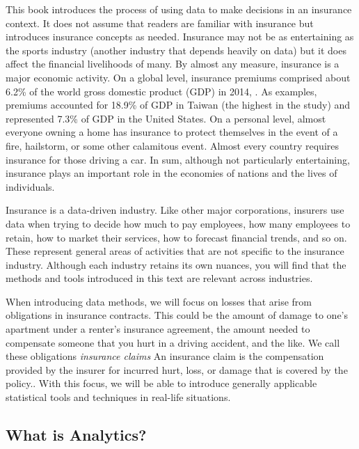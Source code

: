 \documentclass[]{book}
\theoremstyle{definition}
\theoremstyle{definition}
\theoremstyle{definition}
\theoremstyle{remark}
\begin{document}
This book introduces the process of using data to make decisions in an
insurance context. It does not assume that readers are familiar with
insurance but introduces insurance concepts as needed. Insurance may not
be as entertaining as the sports industry (another industry that depends
heavily on data) but it does affect the financial livelihoods of many.
By almost any measure, insurance is a major economic activity. On a
global level, insurance premiums comprised about 6.2\% of the world
gross domestic product (GDP) in 2014, \citep{III2016}. As examples,
premiums accounted for 18.9\% of GDP in Taiwan (the highest in the
study) and represented 7.3\% of GDP in the United States. On a personal
level, almost everyone owning a home has insurance to protect themselves
in the event of a fire, hailstorm, or some other calamitous event.
Almost every country requires insurance for those driving a car. In sum,
although not particularly entertaining, insurance plays an important
role in the economies of nations and the lives of individuals.

Insurance is a data-driven industry. Like other major corporations,
insurers use data when trying to decide how much to pay employees, how
many employees to retain, how to market their services, how to forecast
financial trends, and so on. These represent general areas of activities
that are not specific to the insurance industry. Although each industry
retains its own nuances, you will find that the methods and tools
introduced in this text are relevant across industries.

When introducing data methods, we will focus on losses that arise from
obligations in insurance contracts. This could be the amount of damage
to one's apartment under a renter's insurance agreement, the amount
needed to compensate someone that you hurt in a driving accident, and
the like. We call these obligations \emph{insurance claims}{ An
insurance claim is the compensation provided by the insurer for incurred
hurt, loss, or damage that is covered by the policy.}. With this focus,
we will be able to introduce generally applicable statistical tools and
techniques in real-life situations.

\subsection{What is Analytics?}\label{what-is-analytics}
\end{document}
